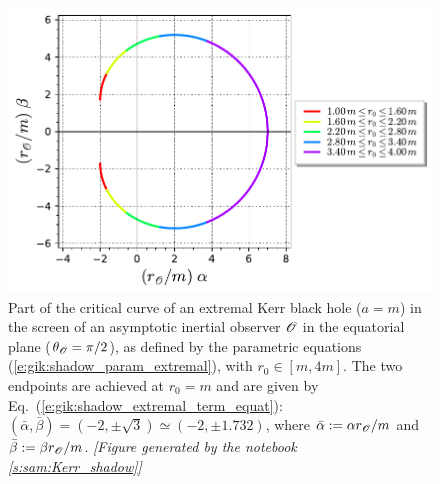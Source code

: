\begin{figure}
\centerline{
\includegraphics[height=0.28\textheight]{gik_shadow_a1_th90_part.pdf} }
\caption[]{\label{f:gik:shadow_a1_th90_part} \footnotesize
Part of the critical curve of an extremal Kerr black hole ($a=m$) in the
screen of an asymptotic inertial observer $\mathscr{O}$ in the equatorial plane
($\theta_{\mathscr{O}} = \pi/2$), as defined by the
parametric equations (\ref{e:gik:shadow_param_extremal}), with $r_0\in[m, 4m]$.
The two endpoints are achieved at $r_0=m$ and are given by Eq.~(\ref{e:gik:shadow_extremal_term_equat}):
$(\bar{\alpha},\bar{\beta}) = (-2, \pm \sqrt{3}) \simeq (-2, \pm 1.732)$, where
$\bar{\alpha}:= \alpha r_{\mathscr{O}}/m$ and $\bar{\beta}:= \beta r_{\mathscr{O}}/m$.
\textsl{[Figure generated by the notebook \ref{s:sam:Kerr_shadow}]}
}
\end{figure}

